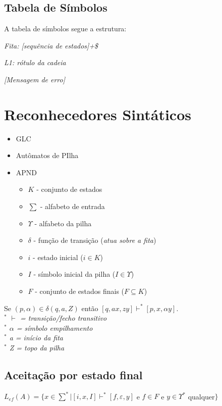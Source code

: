 \documentclass[ 12pt, a4paper]{article}
\begin{document}
	\subsection{Tabela de Símbolos}
		A tabela de símbolos segue a estrutura:
		
		\textit{Fita: [sequência de estados]+\$}
		
		\textit{L1: rótulo da cadeia}
		
		\textit{[Mensagem de erro]}
		
	\section{Reconhecedores Sintáticos}
	
		\begin{itemize}
			\item GLC
			\item Autômatos de PIlha
			\item APND
			\begin{itemize}
				\item $K$ - conjunto de estados
				\item $\sum$ - alfabeto de entrada
				\item $\Upsilon$ - alfabeto da pilha
				\item $\delta$ - função de transição (\textit{atua sobre a fita})
				\item $i$ - estado inicial ($i \in K$)
				\item $I$ - símbolo inicial da pilha ($I \in \Upsilon$)
				\item $F$ - conjunto de estados finais ($F \subseteq K$)
			\end{itemize}			
		\end{itemize}
		
		Se $(p, \alpha)\in \delta(q,a,Z)$ então $[q,ax,zy] \vdash^*[p,x,\alpha y]$.
		\textit{\\ 
		$^*$ $\vdash$ = transição/fecho transitivo\\ 
		$^*$ $\alpha$ = símbolo empilhamento\\
		$^*$ a = início da fita\\ 
		$^*$ Z = topo da pilha\\}
				
		\subsection{Aceitação por estado final}
			$L_{ef}(A)=\{ x \in \sum^* | [i,x,I] \vdash^* [f,\varepsilon,y]$ e $f\in F$ e $y \in \Upsilon^*$ qualquer$\}$
			
\end{document}
